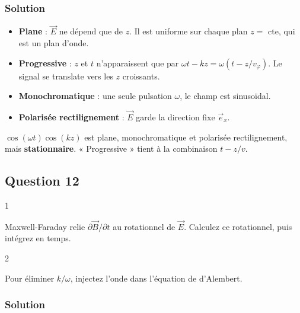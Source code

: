 \documentclass[11pt,a4paper]{article}
\providecommand{\tightlist}{\setlength{\itemsep}{0pt}\setlength{\parskip}{0pt}}
\begin{document}
\hypertarget{solution-10}{%
\subsubsection{Solution}\label{solution-10}}

\begin{itemize}
\tightlist
\item
  \textbf{Plane} : \(\vec E\) ne dépend que de \(z\). Il est uniforme sur chaque plan \(z=\) cte, qui est un plan d'onde.
\item
  \textbf{Progressive} : \(z\) et \(t\) n'apparaissent que par \(\omega t-kz=\omega(t-z/v_\varphi)\). Le signal se translate vers les \(z\) croissants.
\item
  \textbf{Monochromatique} : une seule pulsation \(\omega\), le champ est sinusoïdal.
\item
  \textbf{Polarisée rectilignement} : \(\vec E\) garde la direction fixe \(\vec e_x\).
\end{itemize}

\begin{piege}

\(\cos(\omega t)\cos(kz)\) est plane, monochromatique et polarisée rectilignement, mais \textbf{stationnaire}. « Progressive » tient à la combinaison \(t-z/v\).

\end{piege}

\hypertarget{question-12}{%
\subsection{Question 12}\label{question-12}}

\begin{indication}{1}

Maxwell-Faraday relie \(\partial\vec B/\partial t\) au rotationnel de \(\vec E\). Calculez ce rotationnel, puis intégrez en temps.

\end{indication}

\begin{indication}{2}

Pour éliminer \(k/\omega\), injectez l'onde dans l'équation de d'Alembert.

\end{indication}

\hypertarget{solution-11}{%
\subsubsection{Solution}\label{solution-11}}
\end{document}
